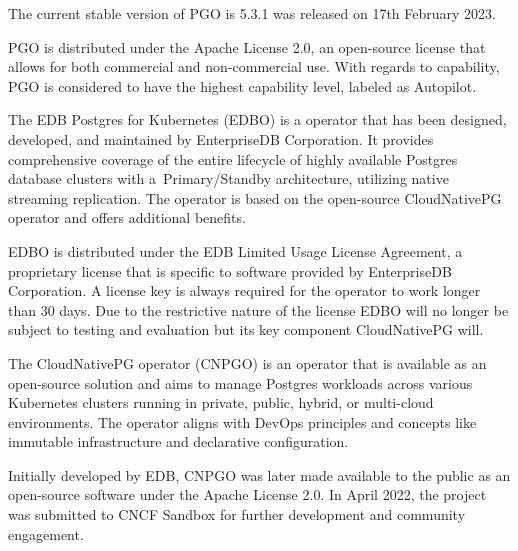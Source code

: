 The current stable version of PGO is 5.3.1 was released on 17th February 2023. \cite{CrunchyV531releaseNotes}

PGO is distributed under the Apache License 2.0, an open-source license that allows for both commercial and non-commercial use. With regards to capability, PGO is considered to have the highest capability level, labeled as Autopilot. \cite{operatorHubCrunchy}

The EDB Postgres for Kubernetes (EDBO) is a operator that has been designed, developed, and maintained by EnterpriseDB Corporation.
It provides comprehensive coverage of the entire lifecycle of highly available Postgres database clusters with a Primary/Standby architecture,
utilizing native streaming replication. The operator is based on the open-source CloudNativePG operator and offers additional benefits. \cite{operatorHubEDB}

EDBO is distributed under the EDB Limited Usage License Agreement, a proprietary license that is specific to software provided by EnterpriseDB Corporation. A license key is always required for the operator to work longer than 30 days. \cite{EDBdocuLicence} Due to the restrictive nature of the license EDBO will no longer be subject to testing and evaluation but its key component CloudNativePG will.

The CloudNativePG operator (CNPGO) is an operator that is available as an open-source solution and aims to manage Postgres workloads across various Kubernetes clusters running in private, public, hybrid, or multi-cloud environments. The operator aligns with DevOps principles and concepts like immutable infrastructure and declarative configuration. \cite{CNPGdocu}

Initially developed by EDB, CNPGO was later made available to the public as an open-source software under the Apache License 2.0. In April 2022, the project was submitted to CNCF Sandbox for further development and community engagement. \cite{CNPGdocu}

